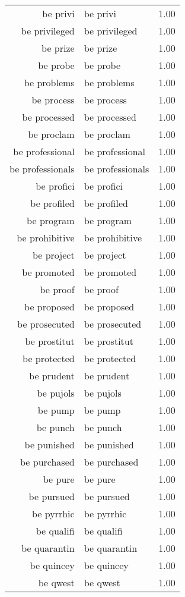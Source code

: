 \begin{table}[ht]
\begin{tabular}{rlr}
  be privi & be privi & 1.00 \\ 
  be privileged & be privileged & 1.00 \\ 
  be prize & be prize & 1.00 \\ 
  be probe & be probe & 1.00 \\ 
  be problems & be problems & 1.00 \\ 
  be process & be process & 1.00 \\ 
  be processed & be processed & 1.00 \\ 
  be proclam & be proclam & 1.00 \\ 
  be professional & be professional & 1.00 \\ 
  be professionals & be professionals & 1.00 \\ 
  be profici & be profici & 1.00 \\ 
  be profiled & be profiled & 1.00 \\ 
  be program & be program & 1.00 \\ 
  be prohibitive & be prohibitive & 1.00 \\ 
  be project & be project & 1.00 \\ 
  be promoted & be promoted & 1.00 \\ 
  be proof & be proof & 1.00 \\ 
  be proposed & be proposed & 1.00 \\ 
  be prosecuted & be prosecuted & 1.00 \\ 
  be prostitut & be prostitut & 1.00 \\ 
  be protected & be protected & 1.00 \\ 
  be prudent & be prudent & 1.00 \\ 
  be pujols & be pujols & 1.00 \\ 
  be pump & be pump & 1.00 \\ 
  be punch & be punch & 1.00 \\ 
  be punished & be punished & 1.00 \\ 
  be purchased & be purchased & 1.00 \\ 
  be pure & be pure & 1.00 \\ 
  be pursued & be pursued & 1.00 \\ 
  be pyrrhic & be pyrrhic & 1.00 \\ 
  be qualifi & be qualifi & 1.00 \\ 
  be quarantin & be quarantin & 1.00 \\ 
  be quincey & be quincey & 1.00 \\ 
  be qwest & be qwest & 1.00 \\ 

\end{tabular}
\end{table}
